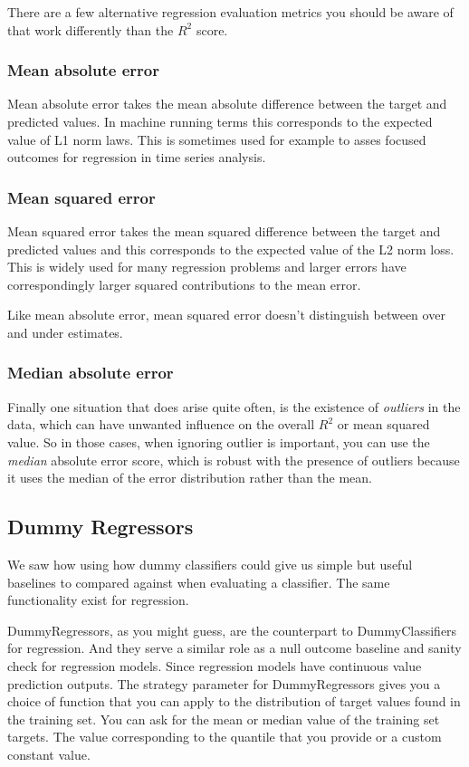 \begin{multicols}{2}
There are a few alternative regression evaluation metrics you should be aware of that work differently than the $R^2$ score. 

\subsubsection{Mean absolute error}

Mean absolute error takes the mean absolute difference between the target and predicted values. In machine running terms this corresponds to the expected value of L1 norm laws. This is sometimes used for example to asses focused outcomes for regression in time series analysis. 

\subsubsection{Mean squared  error}
Mean squared error takes the mean squared difference between the target and predicted values and this corresponds to the expected value of the L2 norm loss. This is widely used for many regression problems and larger errors have correspondingly larger squared contributions to the mean error. 

Like mean absolute error, mean squared error doesn't distinguish between over and under estimates. 

\subsubsection{Median absolute error}

Finally one situation that does arise quite often, is the existence of \emph{outliers} in the data, which can have unwanted influence on the overall $R^2$ or mean squared value. So in those cases, when ignoring outlier is important, you can use the \emph{median} absolute error score, which is robust with the presence of outliers because it uses the median of the error distribution rather than the mean. 

\subsection{Dummy Regressors}

We saw how using how dummy classifiers could give us simple but useful baselines to compared against when evaluating a classifier. The same functionality exist for regression. 

DummyRegressors, as you might guess, are the counterpart to DummyClassifiers for regression. And they serve a similar role as a null outcome baseline and sanity check for regression models. Since regression models have continuous value prediction outputs. The strategy parameter for DummyRegressors gives you a choice of function that you can apply to the distribution of target values found in the training set. You can ask for the mean or median value of the training set targets. The value corresponding to the quantile that you provide or a custom constant value. 


\end{multicols}
